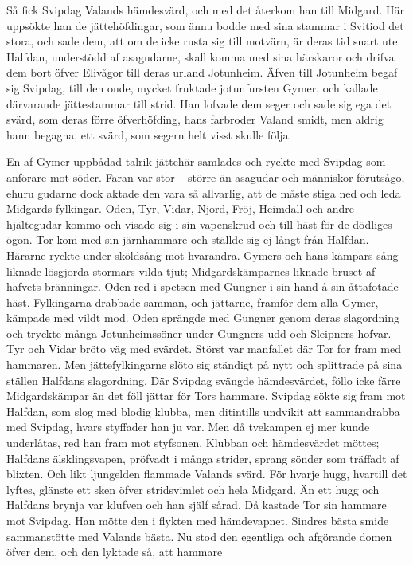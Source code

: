 Så fick Svipdag Valands hämdesvärd, och med det återkom han till
Midgard. Här uppsökte han de jättehöfdingar, som ännu bodde med sina
stammar i Svitiod det stora, och sade dem, att om de icke rusta sig till
motvärn, är deras tid snart ute. Halfdan, understödd af asagudarne,
skall komma med sina härskaror och drifva dem bort öfver Elivågor till
deras urland Jotunheim. Äfven till Jotunheim begaf sig Svipdag, till den
onde, mycket fruktade jotunfursten Gymer, och kallade därvarande
jättestammar till strid. Han lofvade dem seger och sade sig ega det
svärd, som deras förre
öfverhöfding,
hans farbroder Valand smidt, men aldrig hann begagna, ett svärd, som
segern helt visst skulle följa.

En af Gymer uppbådad talrik jättehär samlades och ryckte med Svipdag som
anförare mot söder. Faran var stor -- större än asagudar och människor
förutsågo, ehuru gudarne dock aktade den vara så allvarlig, att de måste
stiga ned och leda Midgards fylkingar. Oden, Tyr, Vidar, Njord, Fröj,
Heimdall och andre hjältegudar kommo och visade sig i sin vapenskrud och
till häst för de dödliges ögon. Tor kom med sin järnhammare och ställde
sig ej långt från Halfdan. Härarne ryckte under sköldsång mot hvarandra.
Gymers och hans kämpars sång liknade lösgjorda stormars vilda tjut;
Midgardskämparnes liknade bruset af hafvets bränningar. Oden red i
spetsen med Gungner i sin hand å sin åttafotade häst. Fylkingarna
drabbade samman, och jättarne, framför dem alla Gymer, kämpade med vildt
mod. Oden sprängde med Gungner genom deras slagordning och tryckte många
Jotunheimssöner under Gungners udd och Sleipners hofvar. Tyr och Vidar
bröto väg med svärdet. Störst var manfallet där Tor for fram med
hammaren. Men jättefylkingarne slöto sig ständigt på nytt och splittrade
på sina ställen Halfdans slagordning. Där Svipdag svängde hämdesvärdet,
föllo icke färre Midgardskämpar än det föll jättar för Tors hammare.
Svipdag sökte sig fram mot Halfdan, som slog med blodig klubba, men
ditintills undvikit att sammandrabba med Svipdag, hvars styffader han ju
var. Men då tvekampen ej mer kunde underlåtas, red han fram mot
styfsonen. Klubban och hämdesvärdet möttes; Halfdans älsklingsvapen,
pröfvadt i många strider, sprang sönder som träffadt af blixten. Och
likt ljungelden flammade Valands svärd. För hvarje hugg, hvartill det
lyftes, glänste ett sken öfver stridsvimlet och hela Midgard. Än ett
hugg och Halfdans brynja var klufven och han själf sårad. Då kastade Tor
sin hammare mot Svipdag. Han mötte den i flykten med hämdevapnet.
Sindres bästa smide sammanstötte med Valands bästa. Nu stod den
egentliga och afgörande domen öfver dem, och den lyktade så, att hammare

